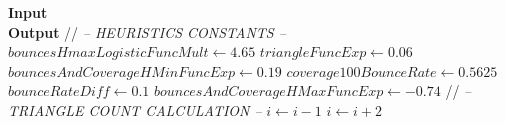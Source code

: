 ﻿\documentclass{article}
\begin{document}
    \begin{algorithmic}
        \hspace*{\algorithmicindent} \textbf{Input} \\
        \hspace*{\algorithmicindent} \textbf{Output}
        \State // \textit{-- HEURISTICS CONSTANTS --}
        \newline
        \State $bouncesHmaxLogisticFuncMult \gets 4.65$
        \State $triangleFuncExp \gets 0.06$
        \State $bouncesAndCoverageHMinFuncExp \gets 0.19$
        \State $coverage100BounceRate \gets 0.5625$
        \State $bounceRateDiff \gets 0.1$
        \State $bouncesAndCoverageHMaxFuncExp \gets -0.74$
        \newline
        \newline
        \State // \textit{-- TRIANGLE COUNT CALCULATION --}
        \newline
            \State $i \gets i-1$
        \Else
                \State $i \gets i+2$
            \EndIf
        \EndIf
    \end{algorithmic}
\end{document}
